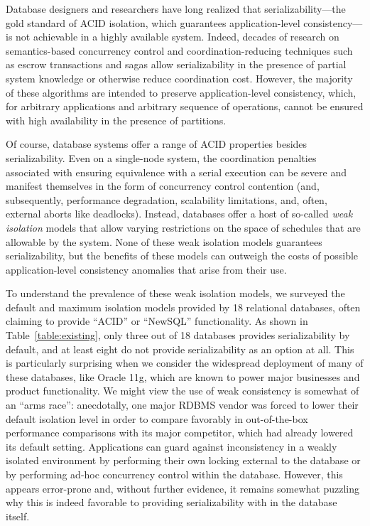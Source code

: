 Database designers and researchers have long realized that
serializability---the gold standard of ACID isolation, which
guarantees application-level consistency---is not achievable in a
highly available system. Indeed, decades of research on
semantics-based concurrency control and coordination-reducing
techniques such as escrow transactions and sagas allow serializability
in the presence of partial system knowledge or otherwise reduce
coordination cost. However, the majority of these algorithms are
intended to preserve application-level consistency, which, for
arbitrary applications and arbitrary sequence of operations, cannot be
ensured with high availability in the presence of partitions.

Of course, database systems offer a range of ACID properties besides
serializability. Even on a single-node system, the coordination
penalties associated with ensuring equivalence with a serial execution
can be severe and manifest themselves in the form of concurrency
control contention (and, subsequently, performance degradation,
scalability limitations, and, often, external aborts like
deadlocks). Instead, databases offer a host of so-called \textit{weak
  isolation} models that allow varying restrictions on the space of
schedules that are allowable by the system. None of these weak
isolation models guarantees serializability, but the benefits of these
models can outweigh the costs of possible application-level
consistency anomalies that arise from their use.

To understand the prevalence of these weak isolation models, we
surveyed the default and maximum isolation models provided by 18
relational databases, often claiming to provide ``ACID'' or ``NewSQL''
functionality. As shown in Table~\ref{table:existing}, only three out
of 18 databases provides serializability by default, and at least
eight do not provide serializability as an option at all. This is
particularly surprising when we consider the widespread deployment of
many of these databases, like Oracle 11g, which are known to power
major businesses and product functionality. We might view the use of
weak consistency is somewhat of an ``arms race'': anecdotally, one
major RDBMS vendor was forced to lower their default isolation level
in order to compare favorably in out-of-the-box performance
comparisons with its major competitor, which had already lowered its
default setting. Applications can guard against inconsistency in a
weakly isolated environment by performing their own locking external
to the database or by performing ad-hoc concurrency control within the
database. However, this appears error-prone and, without further
evidence, it remains somewhat puzzling why this is indeed favorable to
providing serializability with in the database itself.

